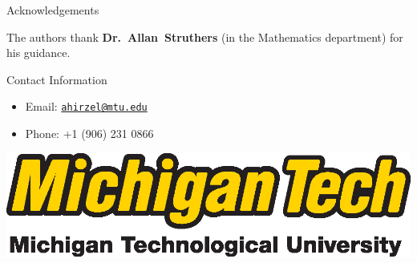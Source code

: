 \documentclass[final]{beamer}
\newlength{\onecolwid}
\begin{document}
\begin{frame}[t]
\begin{columns}[t]
\begin{column}{\onecolwid}

\begin{block}{Acknowledgements}

The authors thank \textbf{Dr.~Allan~Struthers} (in the Mathematics department)
for his guidance.

\end{block}



\begin{block}{Contact Information}

\begin{itemize}
\item Email: \href{mailto:ahirzel@mtu.edu}{\texttt{ahirzel@mtu.edu}}
\item Phone: +1 (906) 231 0866
\end{itemize}

\end{block}

\begin{center}
\includegraphics[width=0.4\linewidth]{logo_withfullname_LG.eps}
\end{center}


\end{column} %

\end{columns} %

\end{frame} %
\end{document}
